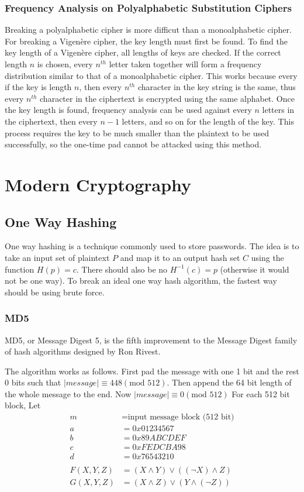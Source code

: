 \documentclass[12pt]{article}
\begin{document}
\subsubsection{Frequency Analysis on Polyalphabetic Substitution Ciphers}
Breaking a polyalphabetic cipher is more difficut than a monoalphabetic cipher. For breaking a Vigen\`{e}re cipher, the key length must first be found. To find the key length of a Vigen\`{e}re cipher, all lengths of keys are checked. If the correct length $n$ is chosen, every $n^{th}$ letter taken together will form a frequency distribution similar to that of a monoalphabetic cipher. This works because every if the key is length $n$, then every $n^{th}$ character in the key string is the same, thus every $n^{th}$ character in the ciphertext is encrypted using the same alphabet. Once the key length is found, frequency analysis can be used against every $n$ letters in the ciphertext, then every $n-1$ letters, and so on for the length of the key. This process requires the key to be much smaller than the plaintext to be used successfully, so the one-time pad cannot be attacked using this method.

\section{Modern Cryptography}
\subsection{One Way Hashing}
One way hashing is a technique commonly used to store passwords. The idea is to take an input set of plaintext $P$ and map it to an output hash set $C$ using the function $H(p)=c$. There should also be no $H^{-1}(c)=p$ (otherwise it would not be one way). To break an ideal one way hash algorithm, the fastest way should be using brute force.
\subsubsection{MD5}
MD5, or Message Digest 5, is the fifth improvement to the Message Digest family of hash algorithms designed by Ron Rivest.

The algorithm works as follows.
First pad the message with one 1 bit and the rest 0 bits such that $\left|message\right|\equiv448(\text{mod }512)$. Then append the 64 bit length of the whole message to the end. Now $\left|message\right|\equiv0(\text{mod }512)$
For each 512 bit block, Let
\begin{align*}
m&=\text{input message block (512 bit)}\\
a&=0x01234567\\
b&=0x89ABCDEF\\
c&=0xFEDCBA98\\
d&=0x76543210\\\\
F(X,Y,Z)&=(X\land Y)\lor((\lnot X)\land Z)\\
G(X,Y,Z)&=(X\land Z)\lor(Y\land(\lnot Z))
\end{align*}
\end{document}

